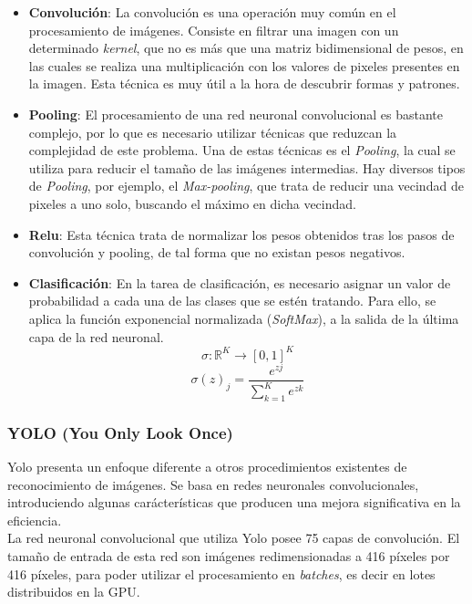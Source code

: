 \documentclass[a4paper]{article}
\begin{document}
\begin{itemize}
    \item \textbf{Convolución}: La convolución es una operación muy común en el procesamiento de 
    imágenes. Consiste en filtrar una imagen con un determinado \textit{kernel}, que
    no es más que una matriz bidimensional de pesos, en las cuales se realiza una multiplicación con
    los valores de pixeles presentes en la imagen. Esta técnica es muy útil a la hora de descubrir
    formas y patrones.
    \item \textbf{Pooling}: El procesamiento de una red neuronal convolucional es bastante complejo, 
    por lo que es necesario utilizar técnicas que reduzcan la complejidad de este problema. Una de 
    estas técnicas es el \textit{Pooling}, la cual se utiliza para reducir el tamaño de las imágenes
    intermedias. Hay diversos tipos de \textit{Pooling}, por ejemplo, el \textit{Max-pooling}, que 
    trata de reducir una vecindad de pixeles a uno solo, buscando el máximo en dicha vecindad.
    \item \textbf{Relu}: Esta técnica trata de normalizar los pesos obtenidos tras los pasos de 
    convolución y pooling, de tal forma que no existan pesos negativos.
    \item \textbf{Clasificación}: En la tarea de clasificación, es necesario asignar un valor de 
    probabilidad a cada una de las clases que se estén tratando. Para ello, se aplica
    la función exponencial normalizada (\textit{SoftMax}), a la salida de la última capa de la red
    neuronal.
    \[\sigma : \mathbb{R}^{K} \rightarrow [0, 1]^K\]
    \[\sigma(z)_j = \frac{e^{zj}}{\sum^{K}_{k = 1}e^{zk}}\]
\end{itemize}

\subsubsection{YOLO (You Only Look Once)}
Yolo presenta un enfoque diferente a otros procedimientos existentes de reconocimiento de imágenes. 
Se basa en redes neuronales convolucionales, introduciendo algunas carácterísticas que producen
una mejora significativa en la eficiencia. \\

La red neuronal convolucional que utiliza Yolo posee 75 capas de convolución. El tamaño de entrada
de esta red son imágenes redimensionadas a 416 píxeles por 416 píxeles, para poder utilizar el 
procesamiento en \textit{batches}, es decir en lotes distribuidos en la GPU. \\
\end{document}
